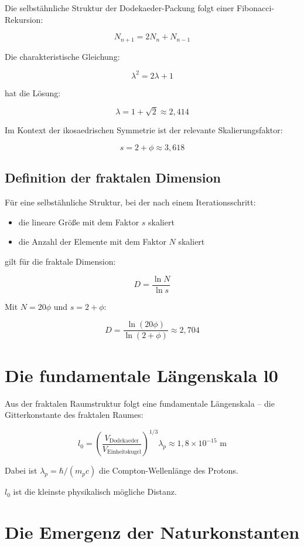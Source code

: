Die selbstähnliche Struktur der Dodekaeder-Packung folgt einer Fibonacci-Rekursion:

\[
N_{n+1} = 2N_n + N_{n-1}
\]

Die charakteristische Gleichung:

\[
\lambda^2 = 2\lambda + 1
\]

hat die Lösung:

\[
\lambda = 1 + \sqrt{2} \approx 2,414
\]

Im Kontext der ikosaedrischen Symmetrie ist der relevante Skalierungsfaktor:

\[
s = 2 + \phi \approx 3,618
\]

\subsection{Definition der fraktalen Dimension}

Für eine selbstähnliche Struktur, bei der nach einem Iterationsschritt:
\begin{itemize}
\item die lineare Größe mit dem Faktor \( s \) skaliert
\item die Anzahl der Elemente mit dem Faktor \( N \) skaliert
\end{itemize}

gilt für die fraktale Dimension:

\[
D = \frac{\ln N}{\ln s}
\]

Mit \( N = 20\phi \) und \( s = 2 + \phi \):

\[
D = \frac{\ln(20\phi)}{\ln(2 + \phi)} \approx 2,704
\]

\section{Die fundamentale Längenskala l0}

Aus der fraktalen Raumstruktur folgt eine fundamentale Längenskala – die Gitterkonstante des fraktalen Raumes:

\[
l_0 = \left( \frac{V_{\text{Dodekaeder}}}{V_{\text{Einheitskugel}}} \right)^{1/3} \lambda_p \approx 1,8 \times 10^{-15} \text{ m}
\]

Dabei ist \( \lambda_p = \hbar/(m_p c) \) die Compton-Wellenlänge des Protons.

\( l_0 \) ist die kleinste physikalisch mögliche Distanz.

\section{Die Emergenz der Naturkonstanten}

